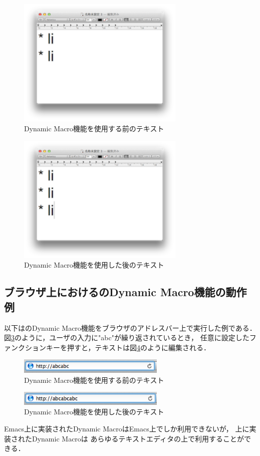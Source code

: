 \begin{figure}[H]
\centerline{\includegraphics[width=80mm,bb=0 0 360 220]{figures/dynamic1.png}}
\caption{Dynamic Macro機能を使用する前のテキスト}
\label{dynamic1}
\end{figure}

\begin{figure}[H]
\centerline{\includegraphics[width=80mm,bb=0 0 360 220]{figures/dynamic2.png}}
\caption{Dynamic Macro機能を使用した後のテキスト}
\label{dynamic2}
\end{figure}

\subsection{ブラウザ上における\system のDynamic Macro機能の動作例}
以下は{\system}のDynamic Macro機能をブラウザのアドレスバー上で実行した例である．
図\ref{dynamic3}のように，ユーザの入力に"abc"が繰り返されているとき，
任意に設定したファンクションキーを押すと，テキストは図\ref{dynamic4}のように編集される．

\begin{figure}[H]
\centerline{\includegraphics[width=70mm,bb=0 0 360 50]{figures/dynamic3.png}}
\caption{Dynamic Macro機能を使用する前のテキスト}
\label{dynamic3}
\end{figure}

\begin{figure}[H]
\centerline{\includegraphics[width=70mm,bb=0 0 360 50]{figures/dynamic4.png}}
\caption{Dynamic Macro機能を使用した後のテキスト}
\label{dynamic4}
\end{figure}

Emacs上に実装されたDynamic MacroはEmacs上でしか利用できないが，
{\system}上に実装されたDynamic Macroは
あらゆるテキストエディタの上で利用することができる．


